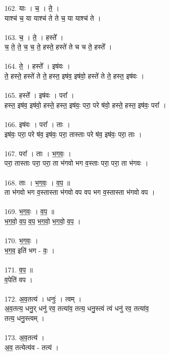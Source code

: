 \subsubsection{}
162. याः । च॒ । ते॒ ।\\
याश्च॑ च॒ या याश्च॑ ते ते च॒ या याश्च॑ ते ।\\
\\
163. च॒ । ते॒ । हस्ते᳚ ।\\
च॒ ते॒ ते॒ च॒ च॒ ते॒ हस्ते॒ हस्ते॑ ते च च ते॒ हस्ते᳚ ।\\
\\
164. ते॒ । हस्ते᳚ । इष॑वः ।\\
ते॒ हस्ते॒ हस्ते॑ ते ते॒ हस्त॒ इष॑व॒ इष॑वो॒ हस्ते॑ ते ते॒ हस्त॒ इष॑वः ।\\
\\
165. हस्ते᳚ । इष॑वः । परा᳚ ।\\
हस्त॒ इष॑व॒ इष॑वो॒ हस्ते॒ हस्त॒ इष॑वः॒ परा॒ परे ष॑वो॒ हस्ते॒ हस्त॒ इष॑वः॒ परा᳚ ।\\
\\
166. इष॑वः । परा᳚ । ताः ।\\
इष॑वः॒ परा॒ परे ष॑व॒ इष॑वः॒ परा॒ तास्ताः परे ष॑व॒ इष॑वः॒ परा॒ ताः ।\\
\\
167. परा᳚ । ताः । भ॒ग॒वः॒ ।\\
परा॒ तास्ताः परा॒ परा॒ ता भ॑गवो भग व॒स्ताः परा॒ परा॒ ता भ॑गवः ।\\
\\
168. ताः । भ॒ग॒वः॒ । व॒प॒ ॥\\
ता भ॑गवो भग व॒स्तास्ता भ॑गवो वप वप भग व॒स्तास्ता भ॑गवो वप ।\\
\\
169. भ॒ग॒वः॒ । व॒प॒ ॥\\
भ॒ग॒वो॒ व॒प॒ व॒प॒ भ॒ग॒वो॒ भ॒ग॒वो॒ व॒प॒ ।\\
\\
170. भ॒ग॒वः॒ ।\\
भ॒ग॒व॒ इति॑ भग - वः॒ ।\\
\\
171. व॒प॒ ॥\\
व॒पेति॑ वप ।\\
\\
172. अ॒व॒तत्य॑ । धनुः॑ । त्वम् ।\\
अ॒व॒तत्य॒ धनु॒र् धनु॑ रव॒ तत्या॑व॒ तत्य॒ धनु॒स्त्वं त्वं धनु॑ रव॒ तत्या॑व॒\\
तत्य॒ धनु॒स्त्वम् ।\\
\\
173. अ॒व॒तत्य॑ ।\\
अ॒व॒ तत्येत्य॑व - तत्य॑ ।\\
